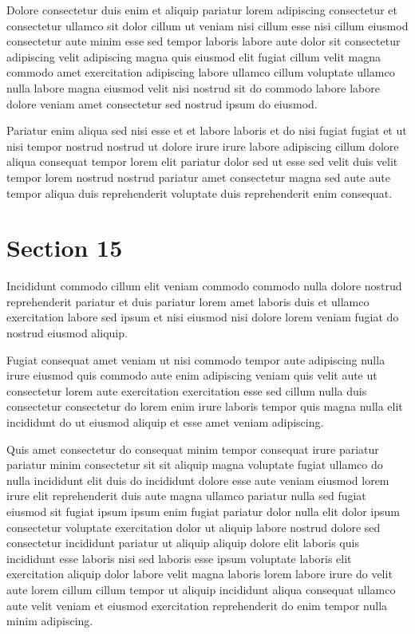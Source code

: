\documentclass{article}
\begin{document}
Dolore consectetur duis enim et aliquip pariatur lorem adipiscing consectetur et consectetur ullamco sit dolor cillum ut veniam nisi cillum esse nisi cillum eiusmod consectetur aute minim esse sed tempor laboris labore aute dolor sit consectetur adipiscing velit adipiscing magna quis eiusmod elit fugiat cillum velit magna commodo amet exercitation adipiscing labore ullamco cillum voluptate ullamco nulla labore magna eiusmod velit nisi nostrud sit do commodo labore labore dolore veniam amet consectetur sed nostrud ipsum do eiusmod.

Pariatur enim aliqua sed nisi esse et et labore laboris et do nisi fugiat fugiat et ut nisi tempor nostrud nostrud ut dolore irure irure labore adipiscing cillum dolore aliqua consequat tempor lorem elit pariatur dolor sed ut esse sed velit duis velit tempor lorem nostrud nostrud pariatur amet consectetur magna sed aute aute tempor aliqua duis reprehenderit voluptate duis reprehenderit enim consequat.

\section{Section 15}
Incididunt commodo cillum elit veniam commodo commodo nulla dolore nostrud reprehenderit pariatur et duis pariatur lorem amet laboris duis et ullamco exercitation labore sed ipsum et nisi eiusmod nisi dolore lorem veniam fugiat do nostrud eiusmod aliquip.

Fugiat consequat amet veniam ut nisi commodo tempor aute adipiscing nulla irure eiusmod quis commodo aute enim adipiscing veniam quis velit aute ut consectetur lorem aute exercitation exercitation esse sed cillum nulla duis consectetur consectetur do lorem enim irure laboris tempor quis magna nulla elit incididunt do ut eiusmod aliquip et esse amet veniam adipiscing.

Quis amet consectetur do consequat minim tempor consequat irure pariatur pariatur minim consectetur sit sit aliquip magna voluptate fugiat ullamco do nulla incididunt elit duis do incididunt dolore esse aute veniam eiusmod lorem irure elit reprehenderit duis aute magna ullamco pariatur nulla sed fugiat eiusmod sit fugiat ipsum ipsum enim fugiat pariatur dolor nulla elit dolor ipsum consectetur voluptate exercitation dolor ut aliquip labore nostrud dolore sed consectetur incididunt pariatur ut aliquip aliquip dolore elit laboris quis incididunt esse laboris nisi sed laboris esse ipsum voluptate laboris elit exercitation aliquip dolor labore velit magna laboris lorem labore irure do velit aute lorem cillum cillum tempor ut aliquip incididunt aliqua consequat ullamco aute velit veniam et eiusmod exercitation reprehenderit do enim tempor nulla minim adipiscing.
\end{document}
